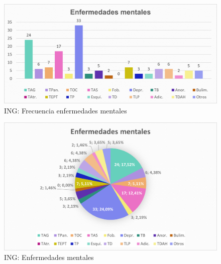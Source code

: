 \documentclass[12pt, a4paper,twoside,titlepage]{book}
\begin{document}
\begin{figure}
    \centering
    \includegraphics[width=.8\linewidth]{ANEXO ING/21AnexINGEng}
    \caption{ING: Frecuencia enfermedades mentales}
    \label{fig:INGTenidas}
\end{figure}
\begin{figure}
    \centering
    \includegraphics[width=.8\linewidth]{ANEXO ING/22AnexINGEnf}
    \caption{ING: Enfermedades mentales}
\end{figure}
\end{document}
